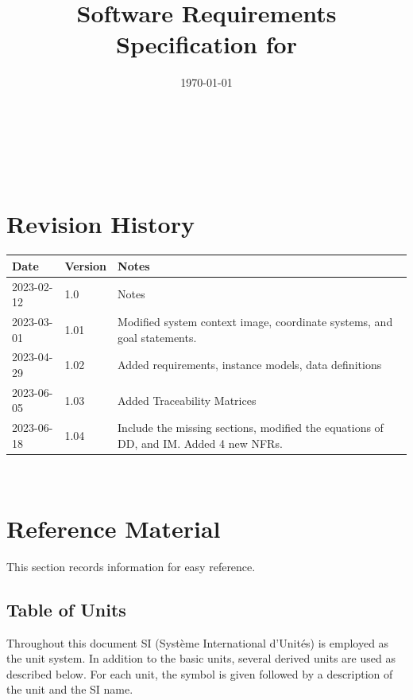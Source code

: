 \documentclass[12pt]{article}
\begin{document}
\title{Software Requirements Specification for \progname{}} 
\author{\authname}
\date{\today}
	
\maketitle

~\newpage


\tableofcontents

~\newpage

\section*{Revision History}

\begin{tabularx}{\textwidth}{p{3cm}p{2cm}X}
\toprule {\bf Date} & {\bf Version} & {\bf Notes}\\
\midrule
2023-02-12 & 1.0 & Notes\\
\midrule
2023-03-01 & 1.01 & Modified system context image, coordinate systems, and goal statements.\\
\midrule
2023-04-29 & 1.02 & Added requirements, instance models, data definitions\\
\midrule
2023-06-05 & 1.03 & Added Traceability Matrices \\
\midrule
2023-06-18 & 1.04 & Include the missing sections, modified the equations of DD, and IM. Added 4 new NFRs.\\
\bottomrule
\end{tabularx}

~\newpage

\section{Reference Material}

This section records information for easy reference.

\subsection{Table of Units}

Throughout this document SI (Syst\`{e}me International d'Unit\'{e}s) is employed
as the unit system.  In addition to the basic units, several derived units are
used as described below.  For each unit, the symbol is given followed by a
description of the unit and the SI name.
\end{document}

